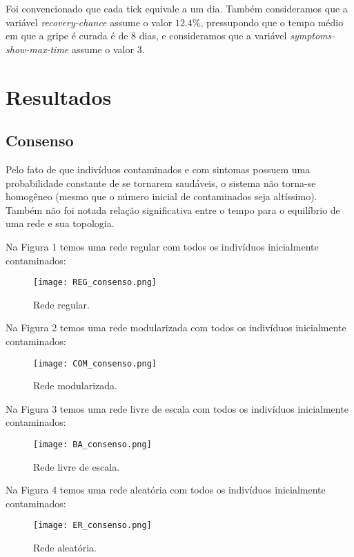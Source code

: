 \documentclass{article}
\begin{document}
Foi convencionado que cada tick equivale a um dia. Também consideramos que a variável \textit{recovery-chance} assume o valor $12.4 \%$, pressupondo que o tempo médio em que a gripe é curada é de 8 dias, e consideramos que a variável \textit{symptoms-show-max-time} assume o valor 3.


\section{Resultados}
\subsection{Consenso}
Pelo fato de que indivíduos contaminados e com sintomas possuem uma probabilidade constante de se tornarem saudáveis, o sistema não torna-se homogêneo (mesmo que o número inicial de contaminados seja altíssimo). Também não foi notada relação significativa entre o tempo para o equilíbrio de uma rede e sua topologia.

Na Figura 1 temos uma rede regular com todos os indivíduos inicialmente contaminados:

\begin{figure}[H]
  \centerline{\texttt{[image: REG\_consenso.png]}}
  \caption{Rede regular.}
  \label{fig:boat1}
\end{figure}

Na Figura 2 temos uma rede modularizada com todos os indivíduos inicialmente contaminados:

\begin{figure}[H]
  \centerline{\texttt{[image: COM\_consenso.png]}}
  \caption{Rede modularizada.}
  \label{fig:boat1}
\end{figure}

Na Figura 3 temos uma rede livre de escala com todos os indivíduos inicialmente contaminados:

\begin{figure}[H]
  \centerline{\texttt{[image: BA\_consenso.png]}}
  \caption{Rede livre de escala.}
  \label{fig:boat1}
\end{figure}

Na Figura 4 temos uma rede aleatória com todos os indivíduos inicialmente contaminados:

\begin{figure}[H]
  \centerline{\texttt{[image: ER\_consenso.png]}}
  \caption{Rede aleatória.}
  \label{fig:boat1}
\end{figure}
\end{document}
